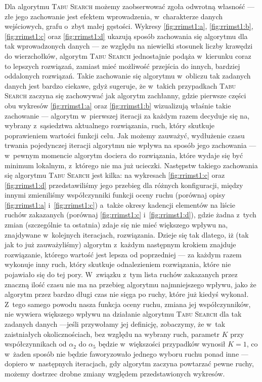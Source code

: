 \begin{figure}[!htbp]
{	}
	\label{fig:rrimst1}
\end{figure}

Dla algorytmu \textsc{Tabu Search} możemy zaobserwować zgoła odwrotną własność --- złe jego zachowanie jest efektem wprowadzenia, w~charakterze danych wejściowych, grafu o~zbyt małej gęstości. Wykresy \ref{fig:rrimst1:a}, \ref{fig:rrimst1:b}, \ref{fig:rrimst1:c} oraz \ref{fig:rrimst1:d} ukazują sposób zachowania się algorytmu dla tak wprowadzonych danych --- ze względu na niewielki stosunek liczby krawędzi do wierzchołków, algorytm \textsc{Tabu Search} jednostajnie podąża w~kierunku coraz to lepszych rozwiązań, zamiast mieć możliwość przejścia do innych, bardziej oddalonych rozwiązań. Takie zachowanie się algorytmu w~obliczu tak zadanych danych jest bardzo ciekawe, gdyż sugeruje, że w~takich przypadkach \textsc{Tabu Search} zaczyna się zachowywać jak algorytm zachłanny, gdzie pierwsze części obu wykresów \ref{fig:rrimst1:a} oraz \ref{fig:rrimst1:b} wizualizują właśnie takie zachowanie --- algorytm w~pierwszej iteracji za każdym razem decyduje się na, wybrany z~sąsiedztwa aktualnego rozwiązania, ruch, który skutkuje poprawieniem wartości funkcji celu. Jak możemy zauważyć, wydłużenie czasu trwania pojedynczej iteracji algorytmu nie wpływa na sposób jego zachowania --- w~pewnym momencie algorytm dociera do rozwiązania, które wydaje się być minimum lokalnym, z~którego nie ma już ucieczki. Następstw takiego zachowania się algorytmu \textsc{Tabu Search} jest kilka: na wykresach \ref{fig:rrimst1:c} oraz \ref{fig:rrimst1:d} przedstawiliśmy jego przebieg dla różnych konfiguracji, między innymi zmieniliśmy współczynniki funkcji oceny ruchu (porównaj opisy \ref{fig:rrimst1:a} i~\ref{fig:rrimst1:c}) a~także okresy kadencji elementów na liście ruchów zakazanych (porównaj \ref{fig:rrimst1:c} i~\ref{fig:rrimst1:d}), gdzie żadna z~tych zmian (szczególnie ta ostatnia) zdaje się nie mieć większego wpływu na, znajdywane w~kolejnych iteracjach, rozwiązania. Dzieje się tak dlatego, iż (tak jak to już zauważyliśmy) algorytm z~każdym następnym krokiem znajduje rozwiązanie, którego wartość jest lepsza od poprzedniej --- za każdym razem wykonuje inny ruch, który skutkuje odnalezieniem rozwiązania, które nie pojawiało się do tej pory. W~związku z~tym lista ruchów zakazanych przez znaczną ilość czasu nie ma na przebieg algorytmu najmniejszego wpływu, jako że algorytm przez bardzo długi czas nie sięga po ruchy, które już kiedyś wykonał. Z~tego samego powodu nasza funkcja oceny ruchu, zmiana jej współczynników, nie wywiera większego wpływu na działanie algorytmu \textsc{Tabu Search} dla tak zadanych danych ---jeśli przywołamy jej definicję, zobaczymy, że w~tak zaistniałych okolicznościach, bez względu na wybrany ruch, parametr $K$ przy współczynnikach od $\alpha_{2}$ do $\alpha_{5}$ będzie w~większości przypadków wynosił $K = 1$, co w~żaden sposób nie będzie faworyzowało jednego wyboru ruchu ponad inne --- dopiero w~następnych iteracjach, gdy algorytm zaczyna powtarzać pewne ruchy, możemy dostrzec drobne zmiany względem przedstawionych wykresów.

